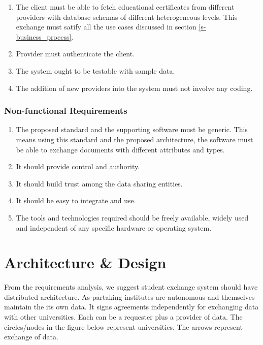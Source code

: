 \documentclass[12pt,a4paper,oneside]{book}
\begin{document}
    \begin{enumerate}

		\item The client must be able to fetch educational certificates from different providers with database schemas of different heterogeneous levels. This exchange must satify all the use cases discussed in section \ref{s-business_process}.

		\item Provider must authenticate the client.
	
		\item The system ought to be testable with sample data.	
		
		\item The addition of new providers into the system must not involve any coding.

	\end{enumerate} 

    \subsection{Non-functional Requirements}

	\begin{enumerate}

		\item The proposed standard and the supporting software must be generic. This means using this standard and the proposed architecture, the software must be able to exchange documents with different attributes and types. 

		\item It should provide control and authority.
	
		\item It should build trust among the data sharing entities. 	
		
		\item It should be easy to integrate and use.
		
		\item The tools and technologies required should be freely available, widely used and independent of any specific hardware or operating system.

	\end{enumerate}

\chapter{Architecture \& Design}\label{ch-architecture-design}
From the requirements analysis, we suggest student exchange system should have distributed architecture. As partaking institutes are autonomous and themselves maintain the its own data. It signs agreements independently for exchanging data with other universities. Each can be a requester plus a provider of data. The circles/nodes in the figure below represent universities. The arrows represent exchange of data.
\end{document}
